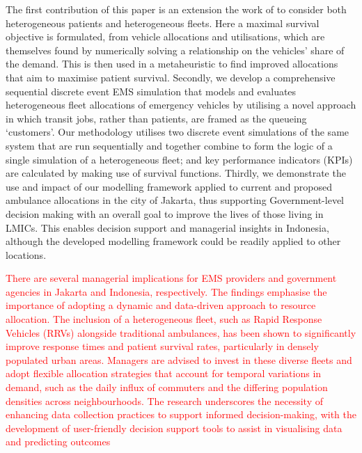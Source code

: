\documentclass[numbers,webpdf,imaman]{ima-authoring-template}%
\begin{document}
The first contribution of this paper is an extension the work of
\citet{Knight2012918} to consider both heterogeneous patients and heterogeneous
fleets. Here a maximal survival objective is formulated, from vehicle
allocations and utilisations, which are themselves found by numerically
solving a relationship on the vehicles' share of the demand. This is then used
in a metaheuristic to find improved allocations that aim to maximise patient
survival.
Secondly, we develop a comprehensive sequential discrete event EMS
simulation that models and evaluates heterogeneous fleet allocations of
emergency vehicles by utilising a novel approach in which transit jobs, rather
than patients, are framed as the queueing `customers'. Our methodology
utilises two discrete event simulations of the same system that are run
sequentially and together combine to form the logic of a single simulation of
a heterogeneous fleet; and key performance indicators (KPIs) are calculated by
making use of survival functions.
Thirdly, we demonstrate the use and impact of our modelling framework applied
to current and proposed ambulance allocations in the city of Jakarta, thus
supporting Government-level decision making with an overall goal to improve
the lives of those living in LMICs. This enables decision support and
managerial insights in Indonesia, although the developed modelling framework
could be readily applied to other locations.

\textcolor{red}{There are several managerial implications for EMS providers and
government agencies in Jakarta and Indonesia, respectively. The findings
emphasise the importance of adopting a dynamic and data-driven approach to
resource allocation. The inclusion of a heterogeneous fleet, such as Rapid
Response Vehicles (RRVs) alongside traditional ambulances, has been shown to
significantly improve response times and patient survival rates, particularly in
densely populated urban areas. Managers are advised to invest in these diverse
fleets and adopt flexible allocation strategies that account for temporal
variations in demand, such as the daily influx of commuters and the differing
population densities across neighbourhoods. The research underscores the
necessity of enhancing data collection practices to support informed
decision-making, with the development of user-friendly decision support tools to
assist in visualising data and predicting outcomes}
\end{document}
